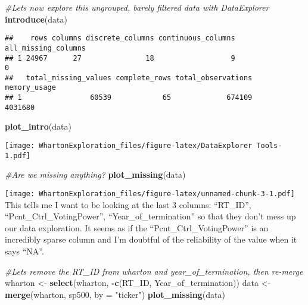 \documentclass[]{article}
\newenvironment{Shaded}{\begin{snugshade}}{\end{snugshade}}
\newcommand{\CommentTok}[1]{\textcolor[rgb]{0.56,0.35,0.01}{\textit{#1}}}
\newcommand{\DataTypeTok}[1]{\textcolor[rgb]{0.13,0.29,0.53}{#1}}
\newcommand{\KeywordTok}[1]{\textcolor[rgb]{0.13,0.29,0.53}{\textbf{#1}}}
\newcommand{\NormalTok}[1]{#1}
\newcommand{\OperatorTok}[1]{\textcolor[rgb]{0.81,0.36,0.00}{\textbf{#1}}}
\newcommand{\StringTok}[1]{\textcolor[rgb]{0.31,0.60,0.02}{#1}}
\begin{document}
\begin{Shaded}
\begin{Highlighting}[]
\CommentTok{#Lets now explore this ungrouped, barely filtered data with DataExplorer}
\KeywordTok{introduce}\NormalTok{(data)}
\end{Highlighting}
\end{Shaded}

\begin{verbatim}
##    rows columns discrete_columns continuous_columns all_missing_columns
## 1 24967      27               18                  9                   0
##   total_missing_values complete_rows total_observations memory_usage
## 1                60539            65             674109      4031680
\end{verbatim}

\begin{Shaded}
\begin{Highlighting}[]
\KeywordTok{plot_intro}\NormalTok{(data)}
\end{Highlighting}
\end{Shaded}

\texttt{[image: WhartonExploration\_files/figure-latex/DataExplorer Tools-1.pdf]}

\begin{Shaded}
\begin{Highlighting}[]
\CommentTok{#Are we missing anything?}
\KeywordTok{plot_missing}\NormalTok{(data)}
\end{Highlighting}
\end{Shaded}

\texttt{[image: WhartonExploration\_files/figure-latex/unnamed-chunk-3-1.pdf]}
This tells me I want to be looking at the last 3 columns: ``RT\_ID'',
``Pcnt\_Ctrl\_VotingPower'', ``Year\_of\_termination'' so that they
don't mess up our data exploration. It seems as if the
``Pcnt\_Ctrl\_VotingPower'' is an incredibly sparse column and I'm
doubtful of the reliability of the value when it says ``NA''.

\begin{Shaded}
\begin{Highlighting}[]
\CommentTok{#Lets remove the RT_ID from wharton and year_of_termination, then re-merge}
\NormalTok{wharton <-}\StringTok{ }\KeywordTok{select}\NormalTok{(wharton, }\OperatorTok{-}\KeywordTok{c}\NormalTok{(RT_ID, Year_of_termination))}
\NormalTok{data <-}\StringTok{ }\KeywordTok{merge}\NormalTok{(wharton, sp500, }\DataTypeTok{by =} \StringTok{"ticker"}\NormalTok{)}
\KeywordTok{plot_missing}\NormalTok{(data)}
\end{Highlighting}
\end{Shaded}
\end{document}
